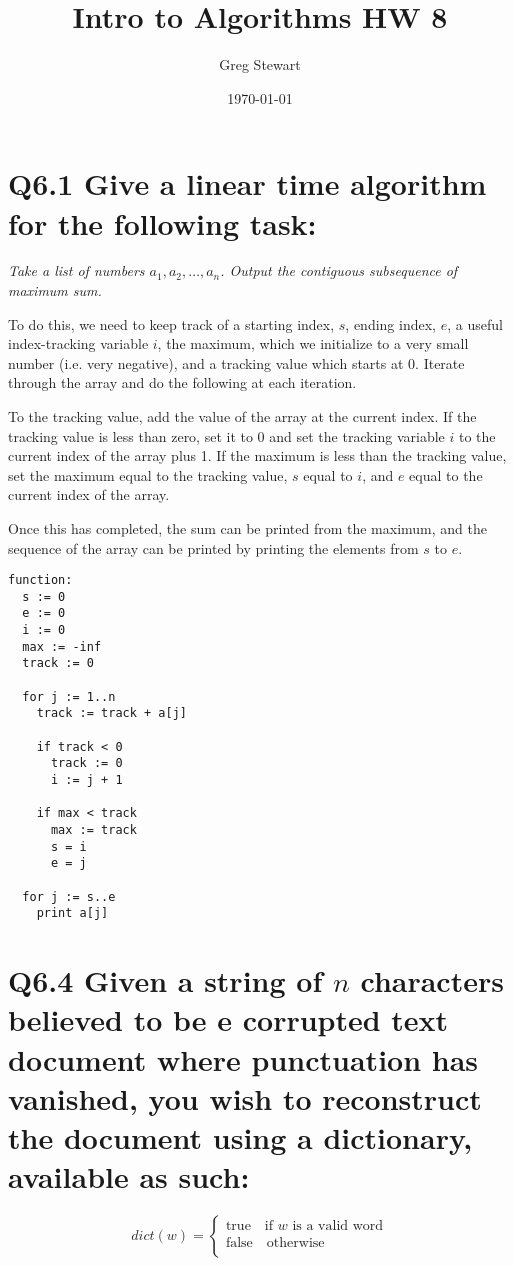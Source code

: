 \documentclass{article}
\title{Intro to Algorithms HW 8}
\author{Greg Stewart}
\date{\today}
\begin{document}
\maketitle

\section*{Q6.1 \normalsize Give a linear time algorithm for the following task:}

\textit{Take a list of numbers $a_1, a_2, \dots, a_n$. Output the contiguous subsequence of maximum sum.}

To do this, we need to keep track of a starting index, $s$, ending index, $e$, a useful index-tracking variable $i$, the maximum, which we initialize to a very small number (i.e. very negative), and a tracking value which starts at 0. Iterate through the array and do the following at each iteration.

To the tracking value, add the value of the array at the current index. If the tracking value is less than zero, set it to 0 and set the tracking variable $i$ to the current index of the array plus 1. If the maximum is less than the tracking value, set the maximum equal to the tracking value, $s$ equal to $i$, and $e$ equal to the current index of the array.

Once this has completed, the sum can be printed from the maximum, and the sequence of the array can be printed by printing the elements from $s$ to $e$.

\begin{verbatim}
function:
  s := 0
  e := 0
  i := 0
  max := -inf
  track := 0

  for j := 1..n
    track := track + a[j]

    if track < 0
      track := 0
      i := j + 1

    if max < track
      max := track
      s = i
      e = j

  for j := s..e
    print a[j]
\end{verbatim}



\section*{Q6.4 \normalsize Given a string of $n$ characters believed to be e corrupted text document where punctuation has vanished, you wish to reconstruct the document using a dictionary, available as such:}

\[
  dict(w) =
  \begin{cases}
    \text{true} \quad \text{if $w$ is a valid word} \\
    \text{false} \quad \text{otherwise} \\
  \end{cases}
\]
\end{document}
